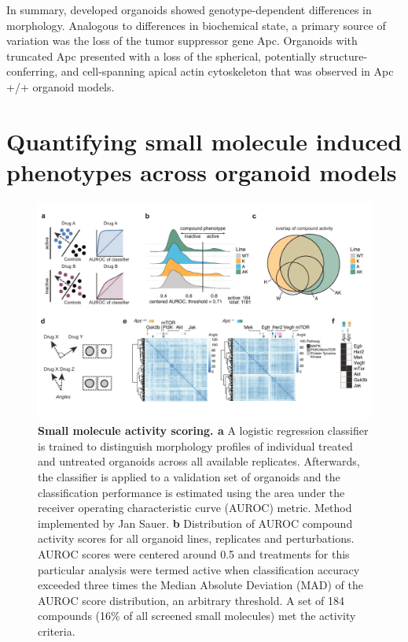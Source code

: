 \begin{flushleft}
\smallbreak
In summary, developed organoids showed genotype-dependent differences in morphology. Analogous to differences in biochemical state, a primary source of variation was the loss of the tumor suppressor gene Apc. Organoids with truncated Apc presented with a loss of the spherical, potentially structure-conferring, and cell-spanning apical actin cytoskeleton that was observed in Apc +/+ organoid models.

\section{Quantifying small molecule induced phenotypes across organoid models}

\begin{figure}[h!]
\centering
\includegraphics[width=\textwidth,
                height=\textheight,
                keepaspectratio]{figures/adenomaprofiling/pdf/fig_1_5.pdf}
\caption{\textbf{Small molecule activity scoring. a} A logistic regression classifier is trained to distinguish morphology profiles of individual treated and untreated organoids across all available replicates. Afterwards, the classifier is applied to a validation set of organoids and the classification performance is estimated using the area under the receiver operating characteristic curve (AUROC) metric. Method implemented by Jan Sauer.
\textbf{b} Distribution of AUROC compound activity scores for all organoid lines, replicates and perturbations. AUROC scores were centered around 0.5 and treatments for this particular analysis were termed active when classification accuracy exceeded three times the Median Absolute Deviation (MAD) of the AUROC score distribution, an arbitrary threshold. A set of 184 compounds (16\% of all screened small molecules) met the activity criteria. 
}
\end{figure}
\end{flushleft}
